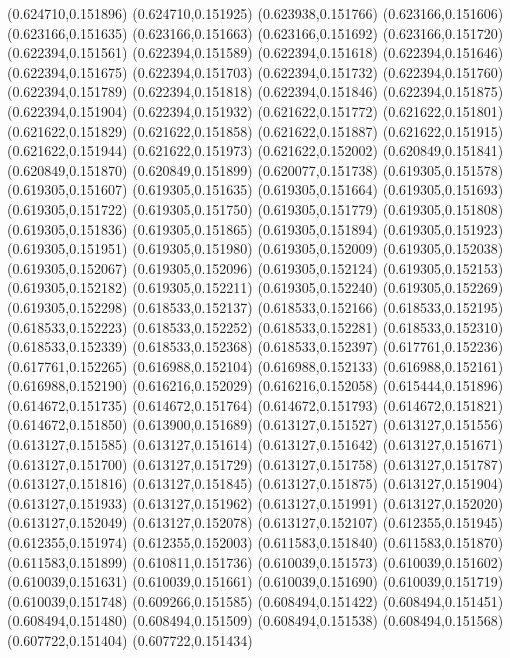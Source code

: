 (0.624710,0.151896)
(0.624710,0.151925)
(0.623938,0.151766)
(0.623166,0.151606)
(0.623166,0.151635)
(0.623166,0.151663)
(0.623166,0.151692)
(0.623166,0.151720)
(0.622394,0.151561)
(0.622394,0.151589)
(0.622394,0.151618)
(0.622394,0.151646)
(0.622394,0.151675)
(0.622394,0.151703)
(0.622394,0.151732)
(0.622394,0.151760)
(0.622394,0.151789)
(0.622394,0.151818)
(0.622394,0.151846)
(0.622394,0.151875)
(0.622394,0.151904)
(0.622394,0.151932)
(0.621622,0.151772)
(0.621622,0.151801)
(0.621622,0.151829)
(0.621622,0.151858)
(0.621622,0.151887)
(0.621622,0.151915)
(0.621622,0.151944)
(0.621622,0.151973)
(0.621622,0.152002)
(0.620849,0.151841)
(0.620849,0.151870)
(0.620849,0.151899)
(0.620077,0.151738)
(0.619305,0.151578)
(0.619305,0.151607)
(0.619305,0.151635)
(0.619305,0.151664)
(0.619305,0.151693)
(0.619305,0.151722)
(0.619305,0.151750)
(0.619305,0.151779)
(0.619305,0.151808)
(0.619305,0.151836)
(0.619305,0.151865)
(0.619305,0.151894)
(0.619305,0.151923)
(0.619305,0.151951)
(0.619305,0.151980)
(0.619305,0.152009)
(0.619305,0.152038)
(0.619305,0.152067)
(0.619305,0.152096)
(0.619305,0.152124)
(0.619305,0.152153)
(0.619305,0.152182)
(0.619305,0.152211)
(0.619305,0.152240)
(0.619305,0.152269)
(0.619305,0.152298)
(0.618533,0.152137)
(0.618533,0.152166)
(0.618533,0.152195)
(0.618533,0.152223)
(0.618533,0.152252)
(0.618533,0.152281)
(0.618533,0.152310)
(0.618533,0.152339)
(0.618533,0.152368)
(0.618533,0.152397)
(0.617761,0.152236)
(0.617761,0.152265)
(0.616988,0.152104)
(0.616988,0.152133)
(0.616988,0.152161)
(0.616988,0.152190)
(0.616216,0.152029)
(0.616216,0.152058)
(0.615444,0.151896)
(0.614672,0.151735)
(0.614672,0.151764)
(0.614672,0.151793)
(0.614672,0.151821)
(0.614672,0.151850)
(0.613900,0.151689)
(0.613127,0.151527)
(0.613127,0.151556)
(0.613127,0.151585)
(0.613127,0.151614)
(0.613127,0.151642)
(0.613127,0.151671)
(0.613127,0.151700)
(0.613127,0.151729)
(0.613127,0.151758)
(0.613127,0.151787)
(0.613127,0.151816)
(0.613127,0.151845)
(0.613127,0.151875)
(0.613127,0.151904)
(0.613127,0.151933)
(0.613127,0.151962)
(0.613127,0.151991)
(0.613127,0.152020)
(0.613127,0.152049)
(0.613127,0.152078)
(0.613127,0.152107)
(0.612355,0.151945)
(0.612355,0.151974)
(0.612355,0.152003)
(0.611583,0.151840)
(0.611583,0.151870)
(0.611583,0.151899)
(0.610811,0.151736)
(0.610039,0.151573)
(0.610039,0.151602)
(0.610039,0.151631)
(0.610039,0.151661)
(0.610039,0.151690)
(0.610039,0.151719)
(0.610039,0.151748)
(0.609266,0.151585)
(0.608494,0.151422)
(0.608494,0.151451)
(0.608494,0.151480)
(0.608494,0.151509)
(0.608494,0.151538)
(0.608494,0.151568)
(0.607722,0.151404)
(0.607722,0.151434)
